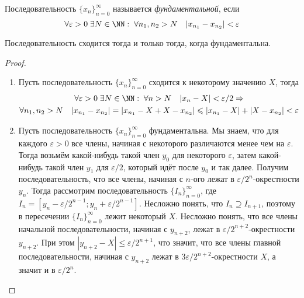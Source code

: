 \documentclass[12pt,a4paper]{article}
\begin{document}
    \begin{definition}
        Последовательность $\{x_n\}_{n=0}^\infty$ называется \emph{фундаментальной}, если
        \[\forall \varepsilon > 0\; \exists N \in \NN:\; \forall n_1, n_2 > N\quad |x_{n_1} - x_{n_2}| < \varepsilon\]
    \end{definition}

    \begin{theorem}\label{fundamental_seq_theorem}
        Последовательность сходится тогда и только тогда, когда фундаментальна.
    \end{theorem}

    \begin{proof}
        \begin{enumerate}
            \item Пусть последовательность $\{x_n\}_{n=0}^\infty$ сходится к некоторому значению $X$, тогда
                \begin{multline*}
                    \forall \varepsilon > 0\; \exists N \in \NN:\; \forall n > N\quad |x_n - X| < \varepsilon/2 \Rightarrow\\
                    \forall n_1, n_2 > N\quad |x_{n_1} - x_{n_2}| = |x_{n_1} - X + X - x_{n_2}| \leqslant |x_{n_1} - X| + |X - x_{n_2}| < \varepsilon
                \end{multline*}
            \item Пусть последовательность $\{x_n\}_{n=0}^\infty$ фундаментальна. Мы знаем, что для каждого $\varepsilon > 0$ все члены, начиная с некоторого различаются менее чем на $\varepsilon$. Тогда возьмём какой-нибудь такой член $y_0$ для некоторого $\varepsilon$, затем какой-нибудь такой член $y_1$ для $\varepsilon/2$, который идёт после $y_0$ и так далее. Получим последовательность, что все члены, начиная с $n$-ого лежат в $\varepsilon/2^n$-окрестности $y_n$. Тогда рассмотрим последовательность $\{I_n\}_{n=0}^\infty$, где $I_n = [y_n - \varepsilon/2^{n-1}; y_n + \varepsilon/2^{n-1}]$. Несложно понять, что $I_n \supseteq I_{n+1}$, поэтому в пересечении $\{I_n\}_{n=0}^\infty$ лежит некоторый $X$. Несложно понять, что все члены начальной последовательности, начиная с $y_{n+2}$, лежат в $\varepsilon/2^{n+2}$-окрестности $y_{n+2}$. При этом $|y_{n+2} - X| \leqslant \varepsilon/2^{n+1}$, что значит, что все члены главной последовательности, начиная с $y_{n+2}$ лежат в $3\varepsilon/2^{n+2}$-окрестности $X$, а значит и в $\varepsilon/2^n$.
        \end{enumerate}
    \end{proof}
\end{document}
